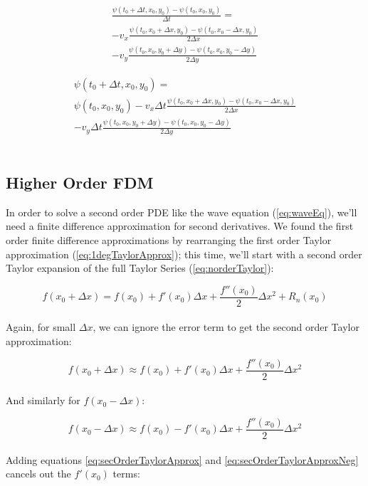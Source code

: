 {\begin{multline}
   \frac{ \psi(t_{0} + \Delta  t,  x_{0}, y_{0}) - \psi(t_{0}, x_{0}, y_{0})}{\Delta t} = \\
   -v_{x}\frac{\psi(t_{0}, x_{0} + \Delta  x, y_{0})-\psi(t_{0}, x_{0}-\Delta x, y_{0})}{2\Delta  x}\\
   -v_{y}\frac{\psi(t_{0}, x_{0}, y_{0} + \Delta  y)-\psi(t_{0}, x_{0}, y_{0}-\Delta y)}{2\Delta  y}
\end{multline}

\begin{multline}\label{eq:advection2Dapprox}
   \psi(t_{0} + \Delta  t,  x_{0}, y_{0}) =\\
   \psi(t_{0}, x_{0}, y_{0}) -v_{x}\Delta t\frac{\psi(t_{0}, x_{0} + \Delta  x, y_{0})-\psi(t_{0}, x_{0}-\Delta x, y_{0})}{2\Delta  x}\\
   -v_{y}\Delta t\frac{\psi(t_{0}, x_{0}, y_{0} + \Delta  y)-\psi(t_{0}, x_{0}, y_{0}-\Delta y)}{2\Delta  y} 
\end{multline}
\\
\subsection{Higher Order FDM}

In order to solve a second order PDE like the wave equation (\ref{eq:waveEq}), we'll need a finite difference approximation for second derivatives.  We found the first order finite difference approximations by rearranging the first order Taylor approximation (\ref{eq:1degTaylorApprox}); this time, we'll start with a second order Taylor expansion of the full Taylor Series (\ref{eq:norderTaylor}):

 \begin{equation}
  f(x_{0} + \Delta  x) = f(x_{0}) + f'(x_{0})\Delta  x + \frac{f''(x_{0})}{2}\Delta  x^{2} + R_{n}(x_{0})
  \end{equation}
    \\
  Again, for small $\Delta  x$, we can ignore the error term to get the second order Taylor approximation:
  
   \begin{equation}\label{eq:secOrderTaylorApprox}
  f(x_{0} + \Delta  x) \approx f(x_{0}) + f'(x_{0})\Delta  x + \frac{f''(x_{0})}{2}\Delta  x^{2}
  \end{equation}
    \\
  And similarly for  $f(x_{0} - \Delta  x)$:
  
     \begin{equation}\label{eq:secOrderTaylorApproxNeg}
  f(x_{0} - \Delta  x) \approx f(x_{0}) - f'(x_{0})\Delta  x + \frac{f''(x_{0})}{2}\Delta  x^{2}
  \end{equation}
    \\
  Adding equations \ref{eq:secOrderTaylorApprox} and \ref{eq:secOrderTaylorApproxNeg} cancels out the $f'(x_{0})$ terms:
  
}
